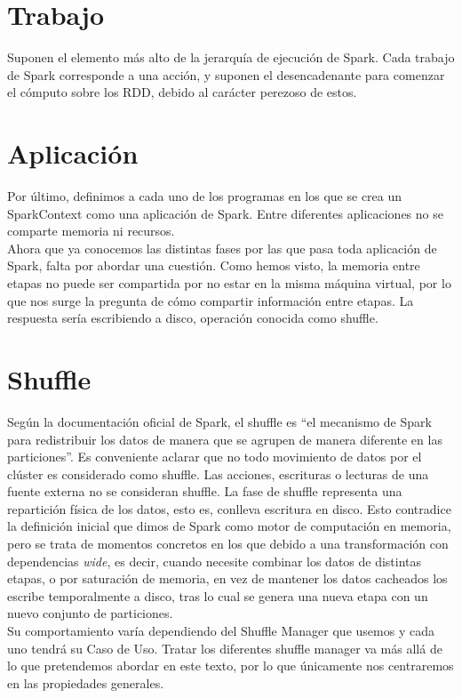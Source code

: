 \section{Trabajo}
Suponen el elemento más alto de la jerarquía de ejecución de Spark. Cada trabajo de Spark corresponde a una acción, y suponen el desencadenante para comenzar el cómputo sobre los RDD, debido al carácter perezoso de estos. \\

\section{Aplicación}
Por último, definimos a cada uno de los programas en los que se crea un SparkContext como una aplicación de Spark. Entre diferentes aplicaciones no se comparte memoria ni recursos.\\

Ahora que ya conocemos las distintas fases por las que pasa toda aplicación de Spark, falta por abordar una cuestión. Como hemos visto, la memoria entre etapas no puede ser compartida por no estar en la misma máquina virtual, por lo que nos surge la pregunta de cómo compartir información entre etapas. La respuesta sería escribiendo a disco, operación conocida como shuffle.\\

\section{Shuffle}
Según la documentación oficial de Spark, el shuffle es “el mecanismo de Spark para redistribuir los datos de manera que se agrupen de manera diferente en las particiones”. Es conveniente aclarar que no todo movimiento de datos por el clúster es considerado como shuffle. Las acciones, escrituras o lecturas de una fuente externa no se consideran shuffle. La fase de shuffle representa una repartición física de los datos, esto es, conlleva escritura en disco. Esto contradice la definición inicial que dimos de Spark como  motor de computación en memoria, pero se trata de momentos concretos en los que debido a una transformación con dependencias \textit{wide}, es decir, cuando necesite combinar los datos de distintas etapas, o por saturación de memoria, en vez de mantener los datos cacheados los escribe temporalmente a disco, tras lo cual se genera una nueva etapa con un nuevo conjunto de particiones.\\

Su comportamiento varía dependiendo del Shuffle Manager que usemos y cada uno tendrá su Caso de Uso. Tratar los diferentes shuffle manager va más allá de lo que pretendemos abordar en este texto, por lo que únicamente nos centraremos en las propiedades generales.\\


